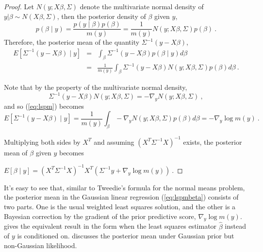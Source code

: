\documentclass[11pt]{article}%
\numberwithin{equation}{section}
\theoremstyle{plain}
\begin{document}
\begin{proof}
Let $N\left(y; X\beta, \Sigma\right)$ denote the multivariate normal density of $y |\beta\sim N\left(X\beta, \Sigma\right)$, then the posterior density of $\beta$ given $y$,
$$
p\left(\beta \mid y\right) = \displaystyle\frac{p\left(y\mid \beta\right)p\left(\beta\right)}{m\left(y\right)} = \frac{1}{m\left(y\right)}N\left(y; X\beta, \Sigma\right)p\left(\beta\right) \ .
$$
Therefore, the posterior mean of the quantity $\Sigma^{-1}\left(y - X\beta\right)$,
\begin{equation}
\label{eq:lspm}
\begin{array}{rcl}
E\left[\Sigma^{-1}\left(y - X\beta\right)\mid y\right]
&=&\int_\beta
\Sigma^{-1}\left(y - X\beta\right)
p\left(\beta\mid y\right)d\beta\\
&=&
\frac{1}{m\left(y\right)}
\int_\beta
\Sigma^{-1}\left(y - X\beta\right)
N\left(y; X\beta, \Sigma\right)p\left(\beta\right)
d\beta \ .
\end{array}
\end{equation}

Note that by the property of the multivariate normal density,
$$
\Sigma^{-1}\left(y - X\beta\right)
N\left(y; X\beta, \Sigma\right)
=
-\nabla_y N\left(y; X\beta, \Sigma\right) \ ,
$$
and so (\ref{eq:lspm}) becomes
$$
E\left[\Sigma^{-1}\left(y - X\beta\right)\mid y\right]
=
\frac{1}{m\left(y\right)}
\int_\beta
-\nabla_y N\left(y; X\beta, \Sigma\right)
p\left(\beta\right)
d\beta 
=
-\nabla_y \log m\left(y\right) \ .
$$

Multiplying both sides by $X^T$ and assuming $\left(X^T\Sigma^{-1}X\right)^{-1}$ exists, the posterior mean of $\beta$ given $y$ becomes
\vspace{0.5pc}

\hfill
$\displaystyle E\left[\beta\mid y\right] = \left(X^T\Sigma^{-1}X\right)^{-1}X^T\left(\Sigma^{-1}y + \nabla_y\log m\left(y\right)\right) \ .$
\hfill
\end{proof}

It's easy to see that, similar to Tweedie's formula for the normal means problem, the posterior mean in the Gaussian linear regression (\ref{eq:lspmbeta}) consists of two parts.  One is the usual weighted least squares solution, and the other is a Bayesian correction by the gradient of the prior predictive score, $\nabla_y \log m\left(y\right)$.  \cite{griffin2010} gives the equivalent result in the form when the least squares estimator $\hat\beta$ instead of $y$ is conditioned on. \cite{masreliez1975} discusses the posterior mean under Gaussian prior but non-Gaussian likelihood. \citep{pericchi1992}
\end{document}
